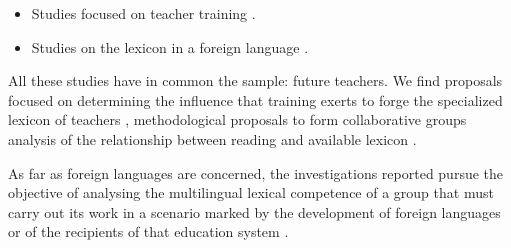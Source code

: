 \documentclass[english]{textolivre}
\begin{document}
\begin{itemize}
    \item Studies focused on teacher training \cite{cerda_futuros_2017,de_la_maya_retamar_disponibilidad_2020,de_la_maya_retamar_habitos_2021,herranz_llacer_disponibilidad_2018,herranz_llacer_palabra_2020,herranz_llacer_alisis_2019,marcos_porcentaje_2021,martinez-lara_incidencia_2021,quintanilla_espinoza_disponibilidad_2019,rojas_metodologialisis_2017,rojas_diaz_metodo_2019,santos-diaz_lexico_2020,valenzuela_castellanos_cambios_2018,zambrano_matamala_estudio_2021}.
    \item Studies on the lexicon in a foreign language \cite{de_la_maya_retamar_desarrollo_2015,de_la_maya_retamar_estudio_2019,_ferreira_predictors_2019,jimenez_catalan_lexical_2014,mora_evaluacion_2014,santos_diaz_organizacion_2017,santos_diaz_activacion_2020}.
\end{itemize}

All these studies have in common the sample: future teachers. We find proposals focused on determining the influence that training exerts to forge the specialized lexicon of teachers \cite{marcos_porcentaje_2021,santos_diaz_concepto_2022,valenzuela_castellanos_cambios_2018,zambrano_matamala_estudio_2021}, methodological proposals to form collaborative groups \cite{rojas_metodologialisis_2017} analysis of the relationship between reading and available lexicon \cite{martinez-lara_incidencia_2021,de_la_maya_retamar_disponibilidad_2020}.

As far as foreign languages are concerned, the investigations reported pursue the objective of analysing the multilingual lexical competence of a group that must carry out its work in a scenario marked by the development of foreign languages \cite{de_la_maya_retamar_habitos_2021,santos_diaz_activacion_2020,santos_diaz_concepto_2022} or of the recipients of that education system \cite{de_la_maya_retamar_desarrollo_2015,de_la_maya_retamar_estudio_2019,_ferreira_predictors_2019,jimenez_catalan_lexical_2014,mora_evaluacion_2014}.
\end{document}
